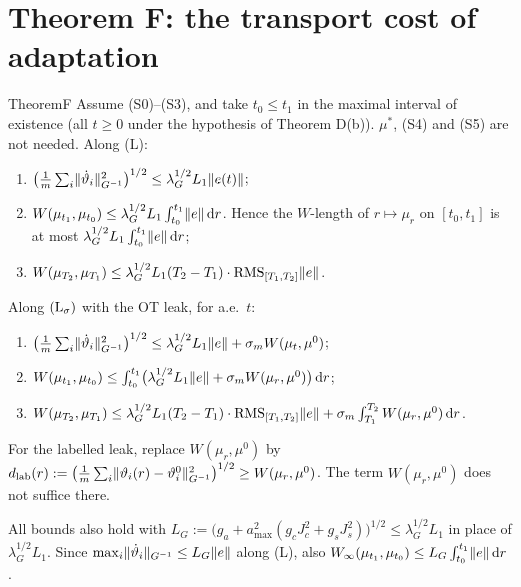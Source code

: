 \section{Theorem F: the transport cost of adaptation}\label{sec:thmF}

\begin{thm}{Theorem}{F}
Assume \textup{(S0)--(S3)}, and take $t_0\le t_1$ in the maximal interval of existence (all $t\ge0$ under the
hypothesis of Theorem D(b)). $\mu^*$, \textup{(S4)} and \textup{(S5)} are not needed. Along \textup{(L)}:
\begin{enumerate}[label=\textup{(\roman*)}]
  \item $\bigl(\frac1m\sum_i\lVert \dot\vartheta_i\rVert^2_{G^{-1}}\bigr)^{1/2}\le\lambda_G^{1/2}L_1\lVert e(t)\rVert$;
  \item $W(\mu_{t_1},\mu_{t_0})\le\lambda_G^{1/2}L_1\int_{t_0}^{t_1}\lVert e\rVert\,\mathrm{d} r$. Hence the $W$-length of
    $r\mapsto\mu_r$ on $[t_0,t_1]$ is at most $\lambda_G^{1/2}L_1\int_{t_0}^{t_1}\lVert e\rVert\,\mathrm{d} r$;
  \item $W(\mu_{T_2},\mu_{T_1})\le\lambda_G^{1/2}L_1(T_2-T_1)\cdot\operatorname{RMS}_{[T_1,T_2]}\lVert e\rVert$.
\end{enumerate}
Along $(\mathrm{L}_\sigma)$ with the OT leak, for a.e.\ $t$:
\begin{enumerate}[label=\textup{(\roman*$'$)}]
  \item $\bigl(\frac1m\sum_i\lVert \dot\vartheta_i\rVert^2_{G^{-1}}\bigr)^{1/2}\le\lambda_G^{1/2}L_1\lVert e\rVert
    +\sigma_mW(\mu_t,\mu^0)$;
  \item $W(\mu_{t_1},\mu_{t_0})\le\int_{t_0}^{t_1}\bigl(\lambda_G^{1/2}L_1\lVert e\rVert+\sigma_mW(\mu_r,\mu^0)\bigr)\,\mathrm{d} r$;
  \item $W(\mu_{T_2},\mu_{T_1})\le\lambda_G^{1/2}L_1(T_2-T_1)\cdot\operatorname{RMS}_{[T_1,T_2]}\lVert e\rVert
    +\sigma_m\int_{T_1}^{T_2}W(\mu_r,\mu^0)\,\mathrm{d} r$.
\end{enumerate}
For the labelled leak, replace $W(\mu_r,\mu^0)$ by
$d_{\mathrm{lab}}(r):=\bigl(\frac1m\sum_i\lVert \vartheta_i(r)-\vartheta^0_i\rVert^2_{G^{-1}}\bigr)^{1/2}\ge
W(\mu_r,\mu^0)$. The term $W(\mu_r,\mu^0)$ does not suffice there.

All bounds also hold with
$L_G:=\bigl(g_a+a_{\max}^2(g_cJ_c^2+g_sJ_s^2)\bigr)^{1/2}\le\lambda_G^{1/2}L_1$ in place of $\lambda_G^{1/2}L_1$. Since
$\max_i\lVert \dot\vartheta_i\rVert_{G^{-1}}\le L_G\lVert e\rVert$ along \textup{(L)}, also
$W_\infty(\mu_{t_1},\mu_{t_0})\le L_G\int_{t_0}^{t_1}\lVert e\rVert\,\mathrm{d} r$.
\end{thm}

